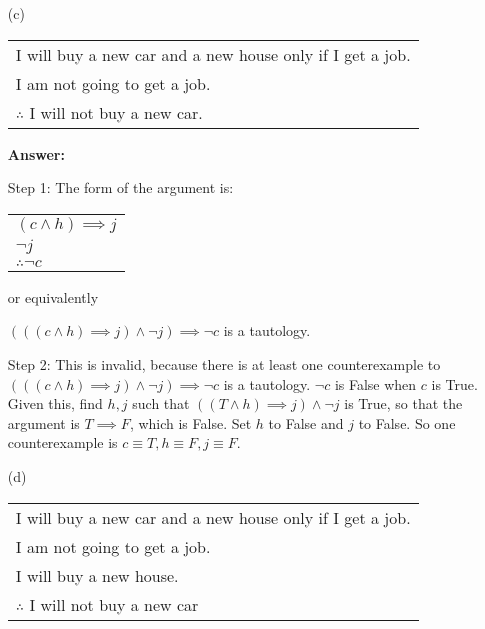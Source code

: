 \documentclass[14pt]{extreport}
\newcommand{\answer}[0]{\medskip \textbf{Answer:} \medskip}
\begin{document}
\begin{enumerate}
        \begin{enumerate}
            
            \item[(c)] 
            \begin{tabular}{l}
                I will buy a new car and a new house only if I get a job. \\
                I am not going to get a job. \\
                \hline
                \( \therefore \) I will not buy a new car. 
            \end{tabular} 
            
                \answer

                Step 1: The form of the argument is:
                \begin{tabular}{l}
                    \( (c \land h) \implies j \) \\
                    \( \neg j \) \\
                    \hline
                    \( \therefore \neg c \)
                \end{tabular}

                or equivalently

                \( (((c \land h) \implies j) \land \neg j) \implies \neg c \) is a tautology.

                \medskip

                Step 2: This is invalid, because there is at least one counterexample to \( (((c \land h) \implies j) \land \neg j) \implies \neg c \) is a tautology. \( \neg c \) is False when \( c \) is True. Given this, find \( h, j \) such that \( ((T \land h) \implies j) \land \neg j \) is True, so that the argument is \( T \implies F \), which is False. Set \( h \) to False and \( j \) to False. So one counterexample is \( c \equiv T, h \equiv F, j \equiv F \).

            \item[(d)]
            \begin{tabular}{l}
                I will buy a new car and a new house only if I get a job. \\
                I am not going to get a job. \\
                I will buy a new house. \\
                \hline
                \( \therefore \) I will not buy a new car
            \end{tabular}
           

\end{enumerate}
\end{enumerate}
\end{document}
